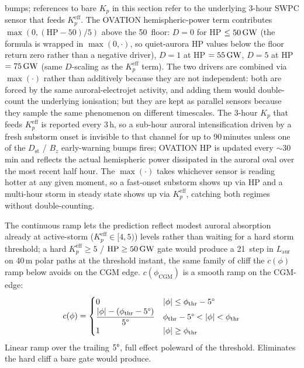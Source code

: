 \documentclass[11pt,a4paper]{article}
\newcommand{\SI}[2]{#1\,\text{#2}}
\newcommand{\dB}{\text{dB}}
\newcommand{\GW}{\text{GW}}
\begin{document}
bumps; references to bare $K_p$ in this section refer to the
underlying 3-hour SWPC sensor that feeds $K_p^{\text{eff}}$.
The OVATION hemispheric-power term contributes $\max(0,
(\text{HP} - 50)/5)$ above the \SI{50}{\GW} floor: $D = 0$ for
HP $\le \SI{50}{\GW}$ (the formula is wrapped in $\max(0,
\cdot)$, so quiet-aurora HP values below the floor return zero
rather than a negative driver), $D = 1$ at HP $= \SI{55}{\GW}$,
$D = 5$ at HP $= \SI{75}{\GW}$ (same $D$-scaling as the
$K_p^{\text{eff}}$ term). The two drivers are combined via $\max(\cdot)$ rather
than additively because they are not independent: both are
forced by the same auroral-electrojet activity, and adding them
would double-count the underlying ionisation; but they are kept
as parallel sensors because they sample the same phenomenon on
different timescales.  The 3-hour $K_p$ that feeds
$K_p^{\text{eff}}$ is reported every 3\,h, so a sub-hour
auroral intensification driven by a fresh substorm onset is
invisible to that channel for up to 90\,minutes unless one of
the $D_{\text{st}}$ / $B_z$ early-warning bumps fires; OVATION
HP is updated every ${\sim}30$\,min and reflects the actual
hemispheric power dissipated in the auroral oval over the most
recent half hour.  The $\max(\cdot)$ takes whichever sensor is
reading hotter at any given moment, so a fast-onset substorm
shows up via HP and a multi-hour storm in steady state shows up
via $K_p^{\text{eff}}$, catching both regimes without
double-counting.

The continuous ramp lets the prediction reflect modest auroral
absorption already at active-storm ($K_p^{\text{eff}} \in [4, 5)$)
levels rather than waiting for a hard storm threshold; a hard
$K_p^{\text{eff}} \geq 5$ / $\text{HP} \geq \SI{50}{\GW}$ gate
would produce a \SI{21}{\dB} step in $L_{\text{aur}}$ on 40\,m
polar paths at the threshold instant, the same family of cliff
the $c(\phi)$ ramp below avoids on the CGM edge.
$c(\phi_{\text{CGM}})$ is a smooth ramp on the CGM-edge:
\begin{equation}\label{eq:cphi}
  c(\phi) = \begin{cases}
    0 & |\phi| \le \phi_{\text{thr}} - 5\text{\textdegree} \\
    \dfrac{|\phi| - (\phi_{\text{thr}} - 5\text{\textdegree})}{5\text{\textdegree}}
        & \phi_{\text{thr}} - 5\text{\textdegree} < |\phi| < \phi_{\text{thr}} \\
    1 & |\phi| \ge \phi_{\text{thr}}
  \end{cases}
\end{equation}
Linear ramp over the trailing $5\text{\textdegree}$, full effect
poleward of the threshold. Eliminates the hard cliff a bare
gate would produce.
\end{document}
